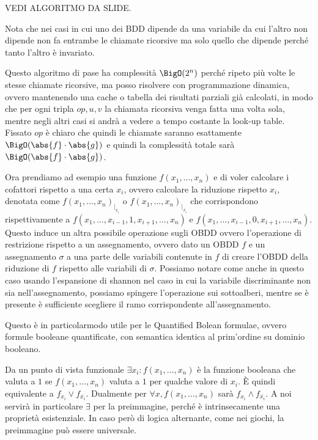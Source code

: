 VEDI ALGORITMO DA SLIDE.

Nota che nei casi in cui uno dei BDD dipende da una variabile da cui l'altro non dipende non fa entrambe le chiamate ricorsive ma solo quello che dipende perché tanto l'altro è invariato.

Questo algoritmo di pase ha complessità \(\BigO(2^n)\) perché ripeto più volte le stesse chiamate ricorsive, ma posso risolvere con programmazione dinamica, ovvero mantenendo una cache o tabella dei risultati parziali già calcolati, in modo che per ogni tripla \(op,u,v\) la chiamata ricorsiva venga fatta una volta sola, mentre negli altri casi si andrà a vedere a tempo costante la look-up table. Fissato \(op\) è chiaro che quindi le chiamate saranno esattamente \(\BigO(\abs{f}\cdot \abs{g})\) e quindi la complessità totale sarà \(\BigO(\abs{f}\cdot \abs{g})\).

Ora prendiamo ad esempio una funzione \(f(x_1,\ldots,x_n)\) e di voler calcolare i cofattori rispetto a una certa \(x_i\), ovvero calcolare la riduzione rispetto \(x_i\), denotata come \(f(x_1,\ldots,x_n)_{|_{x_i}}\) o \(f(x_1,\ldots,x_n)_{|_{\overline{x_i}}}\) che corrispondono rispettivamente a \(f(x_1,\ldots,x_{i-1}, 1, x_{i+1},\ldots,x_n)\) e \(f(x_1,\ldots,x_{i-1}, 0, x_{i+1},\ldots,x_n)\). Questo induce un altra possibile operazione sugli OBDD ovvero l'operazione di restrizione rispetto a un assegnamento, ovvero dato un OBDD \(f\) e un assegnamento \(\sigma\) a una parte delle variabili contenute in \(f\) di creare l'OBDD della riduzione di \(f\) rispetto alle variabili di \(\sigma\). Possiamo notare come anche in questo caso usando l'espansione di shannon nel caso in cui la variabile discriminante non sia nell'assegnamento, possiamo spingere l'operazione sui sottoalberi, mentre se è presente è sufficiente scegliere il ramo corrispondente all'assegnamento.

Questo è in particolarmodo utile per le Quantified Bolean formulae, ovvero formule booleane quantificate, con semantica identica al prim'ordine su dominio booleano.

Da un punto di vista funzionale \(\exists x_i:f(x_1, \ldots, x_n)\) è la funzione booleana che valuta a \(1\) se \(f(x_1, \ldots,x_n)\) valuta a \(1\) per qualche valore di \(x_i\). È quindi equivalente a \(f_{x_i} \lor f_{\overline{x_i}}\). Dualmente per \(\forall x, f(x_1, \ldots, x_n)\) sarà \(f_{x_i} \land f_{\overline{x_i}}\). A noi servirà in particolare \(\exists\) per la preimmagine, perché è intrinsecamente una proprietà esistenziale. In caso però di logica alternante, come nei giochi, la preimmagine può essere universale.

